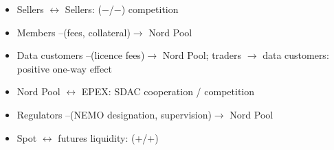 \begin{aiout}
\begin{itemize}
  \item Sellers $\leftrightarrow$ Sellers: ($-$/$-$) competition
  \item Members --(fees, collateral)$\rightarrow$ Nord Pool
  \item Data customers --(licence fees)$\rightarrow$ Nord Pool; traders $\rightarrow$ data customers: positive one-way effect
  \item Nord Pool $\leftrightarrow$ EPEX: SDAC cooperation / competition
  \item Regulators --(NEMO designation, supervision)$\rightarrow$ Nord Pool
  \item Spot $\leftrightarrow$ futures liquidity: (+/+)
\end{itemize}
\end{aiout}
